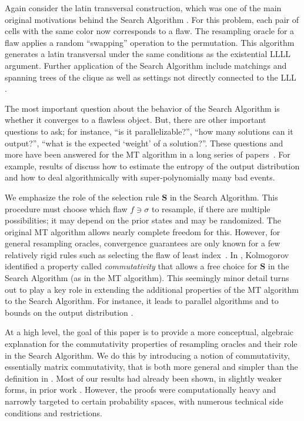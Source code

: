 \documentclass{toc}
\begin{document}
Again consider the latin transversal construction, which was one of the main original motivations behind the  Search Algorithm \cite{PermHarris}. For this problem, each pair of cells with the same color now corresponds to a flaw. The resampling oracle for a flaw applies a random ``swapping'' operation  to the permutation. This algorithm generates a latin transversal under the same conditions as the existential LLLL argument.  Further application of the Search Algorithm include matchings and spanning trees of the clique  \cite{AIJACM, AIK,PermHarris,IS,HV} as well as settings not directly connected to the LLL \cite{AIS,PartResmp2,PartResmp1}.
 
The most important question about the behavior of the Search Algorithm is whether it converges to a flawless object. But, there are other important questions to ask; for instance, ``is it parallelizable?'', ``how many solutions can it output?'', ``what is the expected  `weight' of a solution?''. These questions and more have been answered for the MT algorithm in a long series of papers~\cite{determ,distributed,ParallelHarrisHaeupler,Haeupler_jacm,ParallelHarris,EnuHarris,szege_meet,MT}. 
For example,  results of \cite{Haeupler_jacm,NewBoundsHarris,EnuHarris} discuss how to estimate the entropy of the output distribution and how to deal algorithmically with super-polynomially many bad events.

We emphasize the role of the selection rule $\mathbf S$ in the Search Algorithm. This procedure must choose which flaw $f \ni \sigma$ to resample, if there are multiple possibilities; it may depend on the prior states and may be randomized. The original MT algorithm allows nearly complete freedom for this. However, for general resampling oracles, convergence guarantees are only known for a few relatively rigid rules such as selecting the flaw of least index~\cite{HV}.  In \cite{Kolmofocs}, Kolmogorov identified a property called \emph{commutativity} that allows a free choice for $\mathbf S$ in the Search Algorithm (as in the MT algorithm). This seemingly minor detail turns out to play a key role in extending the additional properties of the MT algorithm to the Search Algorithm. For instance, it leads to parallel algorithms \cite{Kolmofocs} and to bounds on the output distribution \cite{LLLWTL}.   

At a high level, the goal of this paper is to provide a more conceptual, algebraic explanation for the commutativity properties of resampling oracles and their role in the Search Algorithm. We do this by introducing a notion of commutativity, essentially matrix commutativity, that is both more general and simpler than the definition in \cite{Kolmofocs}.  Most of our results had already been shown, in slightly weaker forms, in prior
%
work  %
\cite{Kolmofocs,LLLWTL, NewBoundsHarris}.  However, the proofs were computationally heavy and narrowly targeted to certain probability spaces,  with numerous technical side conditions and restrictions. 
  
\end{document}
